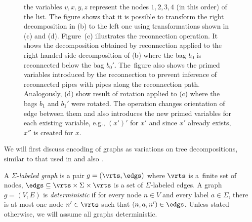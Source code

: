 {\begin{figure}[t]
\begin{center}
{        the variables $v,x,y,z$ represent the nodes $1,2,3,4$ (in this order) of the list.
        The figure shows that it is possible to transform the right decomposition in (b) to the left one using transformations shown in (c) and (d).
        Figure~(c) illustrates the reconnection operation. It shows the decomposition obtained by reconnection applied to  the right-handed side decomposition of (b)
        where the bag $b_0$ is reconnected below the bag $b_0'$.
        The~figure also shows the primed variables introduced by the reconnection to prevent inference of reconnected pipes
        with pipes along the reconnection path.
        Analogously, (d) show result of rotation applied to (c) where the bags $b_1$ and $b_1'$ were rotated.
        The operation changes orientation of edge between them and also introduces the new primed variables for each existing variable,
        e.g., $(x')'$ for $x'$ and since $x'$ already exists, $x''$ is created for $x$.}
\label{fig:decomps}
\end{center}
\end{figure}

We will first discuss encoding of graphs as variations on tree decompositions, similar to that used in \cite{iosif_treewidth_2013} and also \cite{IosifRogalewiczVojnar:deciding}.

A $\Sigma$-\emph{labeled graph} is a pair $g=(\vrts,\edgs)$
where $\vrts$ is a~finite set of nodes,
$\edgs\subseteq \vrts \times \Sigma \times \vrts$
is a set of $\Sigma$-labeled edges.
%
A graph $g = (V,E)$ is \emph{deterministic} if for every node $n\in V$ and every label $a\in\Sigma$,
there is at most one node $n'\in\vrts$ such that $(n,a,n')\in\edgs$.
Unless stated otherwise, we will assume all graphs deterministic.

}
